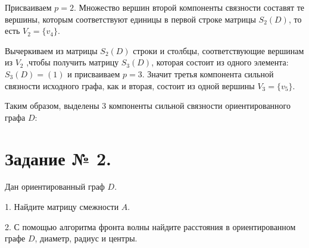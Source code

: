 \documentclass[fleqn]{article}
\begin{document}
Присваиваем $p=2$. Множество вершин второй компоненты связности составят те вершины, которым соответствуют единицы в первой строке матрицы $S_2(D)$, то есть $V_2 = \{v_4\}$.

Вычеркиваем из матрицы $S_2(D)$ строки и столбцы, соответствующие вершинам из $V_2$ ,чтобы получить матрицу $S_3(D)$, которая состоит из одного элемента: $S_3(D)=(1)$ и присваиваем $p=3$. Значит третья компонента сильной связности исходного графа, как и вторая, состоит из одной вершины $V_3 = \{v_5\}$.

Таким образом, выделены $3$ компоненты сильной связности ориентированного графа $D$:

\medskip


\section*{Задание № 2.}

Дан ориентированный граф $D$.

1. Найдите матрицу смежности $A$.

2. С помощью алгоритма фронта волны найдите расстояния в
ориентированном графе $D$, диаметр, радиус и центры.

\medskip
\end{document}
